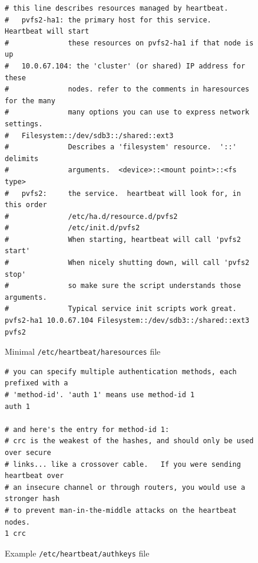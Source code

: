 \documentclass[11pt]{article}
\begin{document}
\begin{figure}
\begin{scriptsize}
\begin{verbatim}
# this line describes resources managed by heartbeat.  
#   pvfs2-ha1: the primary host for this service.  Heartbeat will start
#              these resources on pvfs2-ha1 if that node is up
#   10.0.67.104: the 'cluster' (or shared) IP address for these
#              nodes. refer to the comments in haresources for the many
#              many options you can use to express network settings. 
#   Filesystem::/dev/sdb3::/shared::ext3
#              Describes a 'filesystem' resource.  '::' delimits
#              arguments.  <device>::<mount point>::<fs type>
#   pvfs2:     the service.  heartbeat will look for, in this order
#              /etc/ha.d/resource.d/pvfs2 
#              /etc/init.d/pvfs2
#              When starting, heartbeat will call 'pvfs2 start'
#              When nicely shutting down, will call 'pvfs2 stop'
#              so make sure the script understands those arguments.
#              Typical service init scripts work great.
pvfs2-ha1 10.0.67.104 Filesystem::/dev/sdb3::/shared::ext3 pvfs2
\end{verbatim}
\end{scriptsize}
\caption{Minimal \texttt{/etc/heartbeat/haresources} file}
\label{fig:haresources}
\end{figure}

\begin{figure}
\begin{scriptsize}
\begin{verbatim}
# you can specify multiple authentication methods, each prefixed with a
# 'method-id'. 'auth 1' means use method-id 1
auth 1

# and here's the entry for method-id 1:
# crc is the weakest of the hashes, and should only be used over secure
# links... like a crossover cable.   If you were sending heartbeat over
# an insecure channel or through routers, you would use a stronger hash
# to prevent man-in-the-middle attacks on the heartbeat nodes.
1 crc
\end{verbatim}
\end{scriptsize}
\caption{Example \texttt{/etc/heartbeat/authkeys} file}
\label{fig:authkeys}
\end{figure}
\end{document}
